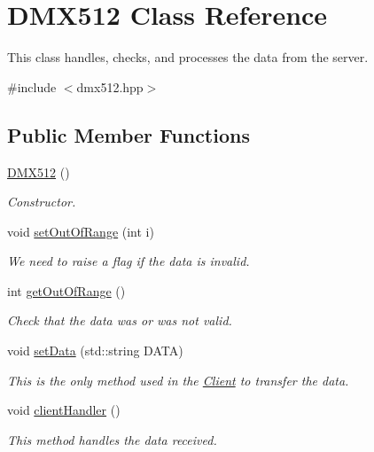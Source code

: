 \hypertarget{classDMX512}{}\section{D\+M\+X512 Class Reference}
\label{classDMX512}


This class handles, checks, and processes the data from the server.  




{\ttfamily \#include $<$dmx512.\+hpp$>$}

\subsection*{Public Member Functions}
\begin{DoxyCompactItemize}
\item 
\hyperlink{classDMX512_a20a4e33b35609a6e1ac54b5812f6704b}{D\+M\+X512} ()
\begin{DoxyCompactList}\small\item\em Constructor. \end{DoxyCompactList}\item 
void \hyperlink{classDMX512_ad392198ed2202ea28a78764ba1d9c453}{set\+Out\+Of\+Range} (int i)
\begin{DoxyCompactList}\small\item\em We need to raise a flag if the data is invalid. \end{DoxyCompactList}\item 
int \hyperlink{classDMX512_aebc0e33cf9e594124b3a48f86bd6a95c}{get\+Out\+Of\+Range} ()
\begin{DoxyCompactList}\small\item\em Check that the data was or was not valid. \end{DoxyCompactList}\item 
void \hyperlink{classDMX512_af7b430f6b8c50ad34773c2f83eaa3db9}{set\+Data} (std\+::string D\+A\+TA)
\begin{DoxyCompactList}\small\item\em This is the only method used in the \hyperlink{namespaceClient}{Client} to transfer the data. \end{DoxyCompactList}\item 
void \hyperlink{classDMX512_a6ae50e79301e42784934bf853c945b45}{client\+Handler} ()
\begin{DoxyCompactList}\small\item\em This method handles the data received. \end{DoxyCompactList}\item 

\end{DoxyCompactItemize}
